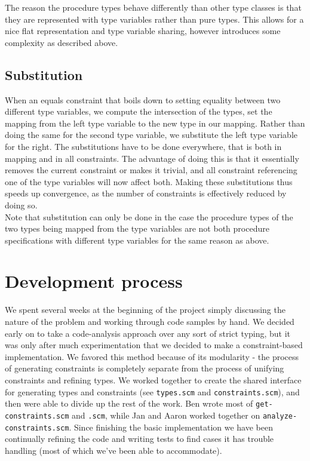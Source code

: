 \documentclass[a4paper]{article}
\begin{document}
The reason the procedure types behave differently than other type classes is that
they are represented with type variables rather than pure types.
This allows for a nice flat representation and type variable sharing,
however introduces some complexity as described above.

\subsection{Substitution}

When an equals constraint that boils down to setting equality between two different
type variables, we compute the intersection of the types, set the mapping from the
left type variable to the new type in our mapping.
Rather than doing the same for the second type variable, we substitute the left type
variable for the right.
The substitutions have to be done everywhere, that is both in mapping and in all constraints.
The advantage of doing this is that it essentially removes the current constraint
or makes it trivial, and all constraint referencing one of the type variables will
now affect both.
Making these substitutions thus speeds up convergence, as the number of constraints
is effectively reduced by doing so.\\

Note that substitution can only be done in the case the procedure types
of the two types being mapped from the type variables are not both procedure specifications
with different type variables for the same reason as above.

\section{Development process}

We spent several weeks at the beginning of the project simply discussing the 
nature of the problem and working through code samples by hand.  We decided 
early on to take a code-analysis approach over any sort of strict typing, but 
it was only after much experimentation that we decided to make a 
constraint-based implementation.  We favored this method because of its 
modularity - the process of generating constraints is completely separate from 
the process of unifying constraints and refining types.  We worked together to 
create the shared interface for generating types and constraints
(see {\tt types.scm} and {\tt constraints.scm}), and then were able to divide 
up the rest of the work.  Ben wrote most of {\tt get-constraints.scm} and 
{\tt \rewrite.scm}, while Jan and Aaron worked together on
{\tt analyze-constraints.scm}.  Since finishing the basic implementation we 
have been continually refining the code and writing tests to find cases it has 
trouble handling (most of which we've been able to accommodate).
\end{document}
